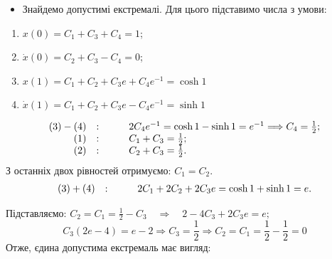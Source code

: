 \documentclass{beamer}
\begin{document}
\begin{frame}
\begin{itemize}
  \item Знайдемо допустимі екстремалі. Для цього підставимо числа з умови:
\end{itemize}
\begin{enumerate}
  \item $x(0) = C_1 + C_3 + C_4= 1$;
  \item $\dot{x} (0) = C_2 + C_3 - C_4 = 0$;
  \item $x(1) = C_1 + C_2 + C_3 e + C_4 e^{-1} = \cosh{1} $
  \item $\dot{x}(1) = C_1 + C_2 + C_3 e - C_4 e^{-1} = \sinh{1} $
\end{enumerate} \par
$$
\begin{array}{r c l}
   (3) - (4) & : \qquad & 2C_4 e^{-1} = \cosh 1 - \sinh{1} = e^{-1} \Longrightarrow C_4 = \frac{1}{2};\\
   (1)  & : \qquad & C_1 + C_3 = \frac{1}{2} ;\\
    (2)& : \qquad & C_2 + C_3 = \frac{1}{2}  .\\
\end{array}
$$
З останніх двох рівностей отримуємо: $C_1 = C_2$.
$$
\begin{array}{r c l}
   (3) + (4) & : \qquad & 2 C_1 + 2C_2 + 2 C_3 e = \cosh 1 + \sinh 1  = e.\\
\end{array}
$$
\end{frame}
\begin{frame}
  Підставляємо: $C_2 = C_1 = \frac{1}{2} - C_3  \quad \Longrightarrow \quad
  2 - 4 C_3 + 2 C_3 e = e;
  $
  $$
  C_3 (2 e - 4) = e -2 \Longrightarrow C_3 = \frac{1}{2} \Longrightarrow C_2 = C_1 = \frac{1}{2} - \frac{1}{2} = 0
  $$
  Отже, \alert{єдина допустима екстремаль має вигляд:}
\begin{center}
\end{center}
\end{frame}
\end{document}
